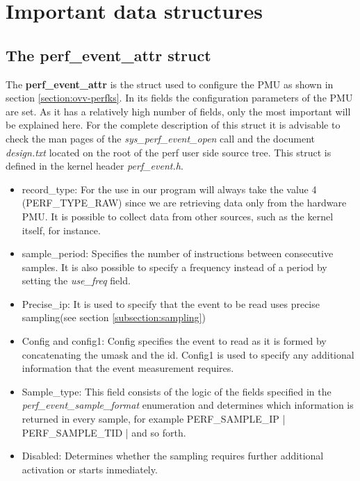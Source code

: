 \section{Important data structures}\label{section:important-structs}

\subsection{The perf\_event\_attr struct}\label{section:pea-stru}

The \textbf{perf\_event\_attr} is the struct used to configure the PMU as shown in section \ref{section:ovv-perfks}. In its fields the configuration parameters of the PMU are set. As it has a relatively high number of fields, only the most important will be explained here. For the complete description of this struct it is advisable to check the man pages of the \textit{sys\_perf\_event\_open} call and the document \textit{design.txt} located on the root of the perf user side source tree. This struct is defined in the kernel header \textit{perf\_event.h}. 
\begin{itemize}
	\item record\_type: For the use in our program will always take the value 4 (PERF\_TYPE\_RAW) since we are retrieving data only from the hardware PMU. It is possible to collect data from other sources, such as the kernel itself, for instance.
	\item sample\_period: Specifies the number of instructions between consecutive samples. It is also possible to specify a frequency instead of a period by setting the \textit{use\_freq} field.
	\item Precise\_ip: It is used to specify that the event to be read uses precise sampling(see section \ref{subsection:sampling}) 
	\item Config and config1: Config specifies the event to read as it is formed by concatenating the umask and the id. Config1 is used to specify any additional information that the event measurement requires. 
	\item Sample\_type: This field consists of the logic of the fields specified in the \textit{perf\_event\_sample\_format} enumeration and determines which information is returned in every sample, for example PERF\_SAMPLE\_IP | PERF\_SAMPLE\_TID | and so forth.
	\item Disabled: Determines whether the sampling requires further additional activation or starts inmediately.
\end{itemize}
     
